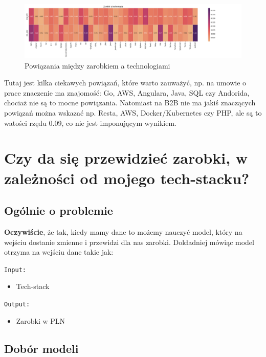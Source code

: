 \documentclass[a4paper]{article}
\begin{document}
\begin{figure}[H]
    \centering
    \includegraphics[width=\textwidth]{../analysis/plots/korelacje/zarobki_a_technologie.png}
    \caption{Powiązania między zarobkiem a technologiami}
\end{figure}

\quad Tutaj jest kilka ciekawych powiązań, które warto zauważyć, np. na umowie o prace znaczenie ma
znajomość: Go, AWS, Angulara, Java, SQL czy Andorida, chociaż nie są to mocne powiązania. Natomiast na B2B nie ma jakiś znaczących powiązań można wskazać
np. Resta, AWS, Docker/Kubernetes czy PHP, ale są to watości rzędu 0.09, co nie jest imponującym wynikiem.


\section{Czy da się przewidzieć zarobki, w zależności od mojego tech-stacku?}

\subsection{Ogólnie o problemie}

\quad \textbf{Oczywiście}, że tak, kiedy mamy dane to możemy nauczyć model, który na wejściu dostanie zmienne i przewidzi dla nas
zarobki. Dokładniej mówiąc model otrzyma na wejściu dane takie jak:

\texttt{Input:}

\begin{itemize}
    \item Tech-stack
\end{itemize}

\texttt{Output:}

\begin{itemize}
    \item Zarobki w PLN
\end{itemize}


\subsection{Dobór modeli}
\end{document}
